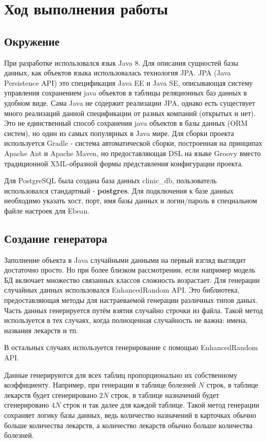 \documentclass[a4paper]{article}
\begin{document}
\section{Ход выполнения работы}
\subsection{Окружение}
При разработке использовался язык Java 8.
Для описания сущностей базы данных, как объектов языка использовалась технология JPA. JPA (Java Persistence API) это спецификация Java EE и Java SE, описывающая систему управления сохранением java объектов в таблицы реляционных баз данных в удобном виде. Сама Java не содержит реализации JPA, однако есть существует много реализаций данной спецификации от разных компаний (открытых и нет). Это не единственный способ сохранения java объектов в базы данных (ORM систем), но один из самых популярных в Java мире.
Для сборки проекта используется Gradle - система автоматической сборки, построенная на принципах Apache Ant и Apache Maven, но предоставляющая DSL на языке Groovy вместо традиционной XML-образной формы представления конфигурации проекта.

Для PostgreSQL была создана база данных clinic\_db, пользователь использовался стандартный - \textbf{postgres}. 
Для подключения к базе данных необходимо указать хост, порт, имя базы данных и логин/пароль в специальном файле настроек для Ebean.

\subsection{Создание генератора}
Заполнение объекта в Java случайными данными на первый взгляд выглядит достаточно просто. Но при более близком рассмотрении, если например модель БД включает множество связанных классов сложность возрастает. Для генерации случайных данных использовался EnhancedRandom API. Это библиотека, предоставляющая методы для настраеваемой генерации различных типов даных.
Часть данных генерируется путём взятия случайно строчки  из файла. Такой метод используется в тех случаях, когда полноценная случайность не важна: имена, названия лекарств и тп.

В остальных случаях используется генерирование с помощью EnhancedRandom API.

Данные генерируются для всех таблиц пропорционально их собственному коэффициенту. Например, при генерации в таблице болезней $N$ строк, в таблице лекарств будет сгенерировано $2N$ строк, в таблице назначений будет сгенерировано $4N$ строк и так далее для каждой таблице. Такой метод генерации сохраняет логику базы данных, ведь количество назначений в карточках обычно больше количества лекарств, а количество лекарств обычно больше количества болезней.
\end{document}
